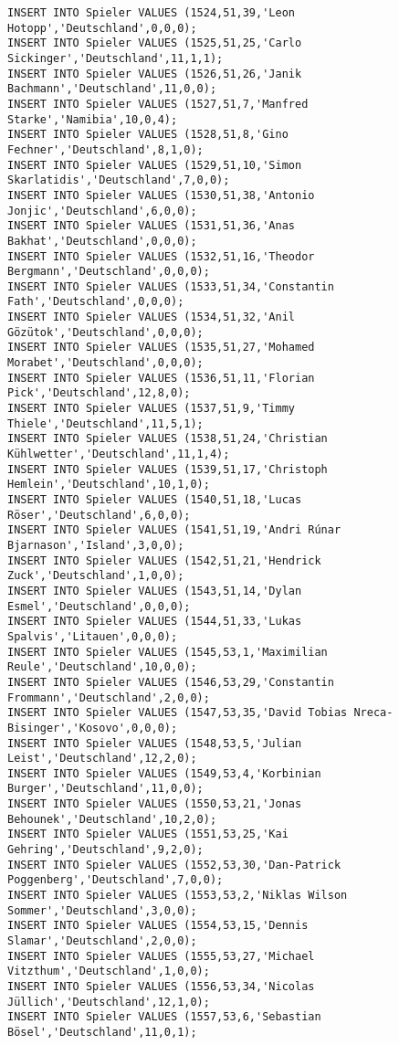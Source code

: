 \documentclass{lehramt-informatik-aufgabe}
\begin{document}
\begin{verbatim}
INSERT INTO Spieler VALUES (1524,51,39,'Leon Hotopp','Deutschland',0,0,0);
INSERT INTO Spieler VALUES (1525,51,25,'Carlo Sickinger','Deutschland',11,1,1);
INSERT INTO Spieler VALUES (1526,51,26,'Janik Bachmann','Deutschland',11,0,0);
INSERT INTO Spieler VALUES (1527,51,7,'Manfred Starke','Namibia',10,0,4);
INSERT INTO Spieler VALUES (1528,51,8,'Gino Fechner','Deutschland',8,1,0);
INSERT INTO Spieler VALUES (1529,51,10,'Simon Skarlatidis','Deutschland',7,0,0);
INSERT INTO Spieler VALUES (1530,51,38,'Antonio Jonjic','Deutschland',6,0,0);
INSERT INTO Spieler VALUES (1531,51,36,'Anas Bakhat','Deutschland',0,0,0);
INSERT INTO Spieler VALUES (1532,51,16,'Theodor Bergmann','Deutschland',0,0,0);
INSERT INTO Spieler VALUES (1533,51,34,'Constantin Fath','Deutschland',0,0,0);
INSERT INTO Spieler VALUES (1534,51,32,'Anil Gözütok','Deutschland',0,0,0);
INSERT INTO Spieler VALUES (1535,51,27,'Mohamed Morabet','Deutschland',0,0,0);
INSERT INTO Spieler VALUES (1536,51,11,'Florian Pick','Deutschland',12,8,0);
INSERT INTO Spieler VALUES (1537,51,9,'Timmy Thiele','Deutschland',11,5,1);
INSERT INTO Spieler VALUES (1538,51,24,'Christian Kühlwetter','Deutschland',11,1,4);
INSERT INTO Spieler VALUES (1539,51,17,'Christoph Hemlein','Deutschland',10,1,0);
INSERT INTO Spieler VALUES (1540,51,18,'Lucas Röser','Deutschland',6,0,0);
INSERT INTO Spieler VALUES (1541,51,19,'Andri Rúnar Bjarnason','Island',3,0,0);
INSERT INTO Spieler VALUES (1542,51,21,'Hendrick Zuck','Deutschland',1,0,0);
INSERT INTO Spieler VALUES (1543,51,14,'Dylan Esmel','Deutschland',0,0,0);
INSERT INTO Spieler VALUES (1544,51,33,'Lukas Spalvis','Litauen',0,0,0);
INSERT INTO Spieler VALUES (1545,53,1,'Maximilian Reule','Deutschland',10,0,0);
INSERT INTO Spieler VALUES (1546,53,29,'Constantin Frommann','Deutschland',2,0,0);
INSERT INTO Spieler VALUES (1547,53,35,'David Tobias Nreca-Bisinger','Kosovo',0,0,0);
INSERT INTO Spieler VALUES (1548,53,5,'Julian Leist','Deutschland',12,2,0);
INSERT INTO Spieler VALUES (1549,53,4,'Korbinian Burger','Deutschland',11,0,0);
INSERT INTO Spieler VALUES (1550,53,21,'Jonas Behounek','Deutschland',10,2,0);
INSERT INTO Spieler VALUES (1551,53,25,'Kai Gehring','Deutschland',9,2,0);
INSERT INTO Spieler VALUES (1552,53,30,'Dan-Patrick Poggenberg','Deutschland',7,0,0);
INSERT INTO Spieler VALUES (1553,53,2,'Niklas Wilson Sommer','Deutschland',3,0,0);
INSERT INTO Spieler VALUES (1554,53,15,'Dennis Slamar','Deutschland',2,0,0);
INSERT INTO Spieler VALUES (1555,53,27,'Michael Vitzthum','Deutschland',1,0,0);
INSERT INTO Spieler VALUES (1556,53,34,'Nicolas Jüllich','Deutschland',12,1,0);
INSERT INTO Spieler VALUES (1557,53,6,'Sebastian Bösel','Deutschland',11,0,1);

\end{verbatim}
\end{document}

